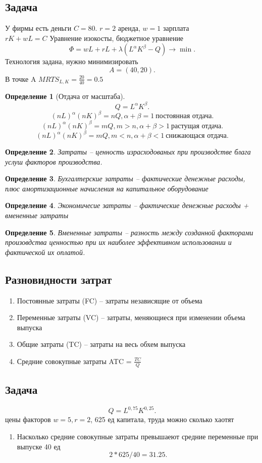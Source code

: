 \documentclass[14pt]{extarticle}
\newtheorem{definition}{Определение}
\begin{document}
\subsection{Задача}
У фирмы есть деньги $C = 80$.  $r=2$ аренда,  $w = 1$ зарплата
\\
$rK + wL = C$ Уравнение изокосты, бюджетное уравнение
\[
	\Phi = wL + rL + \lambda (L^{\alpha} K^{\beta} - Q) \to \min
	.\]
Технология задана, нужно минимизировать
\[
	A = (40,20)
	.\]
В точке A $MRTS_{L,K} = \frac{20}{40} = 0.5$
\begin{definition}[Отдача от масштаба]
	\[
		Q = L^{\alpha} K^{\beta}
		.\]
	\[
		(nL)^{\alpha} (n K)^{\beta} = nQ , \alpha+\beta = 1 ~ \text{постоянная отдача}
		.\]
	\[
		(nL)^{\alpha} (n K)^{\beta} = mQ , m > n,\alpha + \beta >1 ~ \text{растущая отдача}
		.\]
	\[
		(nL)^{\alpha} (n K)^{\beta} = mQ , m < n, \alpha + \beta < 1 ~ \text{снижающася отдача}
		.\]
\end{definition}
\begin{definition}
	Затраты -- ценность израсходованых при производстве блага услуш факторов производства.
\end{definition}
\begin{definition}
	Бухгалтерские затраты -- фактические денежные расходы, плюс амортизационные начисления на капитальное оборудование
\end{definition}
\begin{definition}
	Экономичесие затраты -- фактические денежные расходы + вмененные затраты
\end{definition}
\begin{definition}
	Вмененные затраты -- разность между созданной факторами произовдства ценностью при их наиболее эффективном использовании и фактической их оплатой.
\end{definition}
\subsection{Разновидности затрат}
\begin{enumerate}
	\item Постоянные затраты (FC) -- затраты независящие от объема
	\item Переменные затраты (VC) -- затраты, меняющиеся при изменении объема выпуска
	\item Общие затраты (TC) -- затраты на весь обхем выпуска
	\item Средние совокупные затраты ATC = $\frac{TC}{Q}$
\end{enumerate}
\subsection{Задача}
\[
Q = L^{0,75}K^{0,25}
.\] 
цены факторов $w = 5,r=2$, 625 ед капитала, труда можно сколько хаотят
 \begin{enumerate}
    \item Насколько средние совокупные затраты превышаеют средние переменные при выпуске 40 ед
        \[
        2 * 625 / 40 = 31.25
        .\] 
\end{enumerate}
\end{document}
